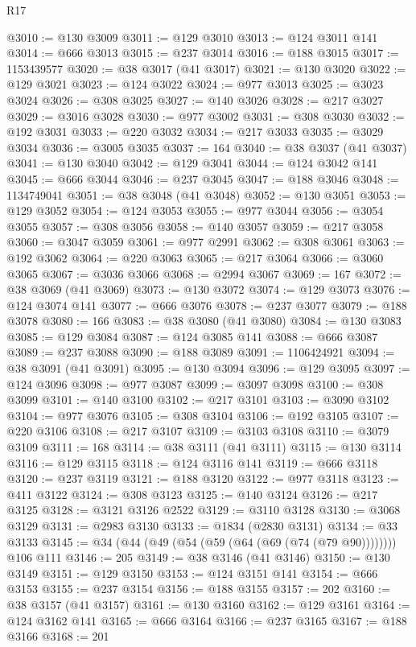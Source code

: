 \begin{lexlean}{R17}
\begin{coremodule}
@3010 := @130 @3009
@3011 := @129 @3010
@3013 := @124 @3011 @141
@3014 := @666 @3013
@3015 := @237 @3014
@3016 := @188 @3015
@3017 := 1153439577
@3020 := @38 @3017 (@41 @3017)
@3021 := @130 @3020
@3022 := @129 @3021
@3023 := @124 @3022
@3024 := @977 @3013
@3025 := @3023 @3024
@3026 := @308 @3025
@3027 := @140 @3026
@3028 := @217 @3027
@3029 := @3016 @3028
@3030 := @977 @3002
@3031 := @308 @3030
@3032 := @192 @3031
@3033 := @220 @3032
@3034 := @217 @3033
@3035 := @3029 @3034
@3036 := @3005 @3035
@3037 := 164
@3040 := @38 @3037 (@41 @3037)
@3041 := @130 @3040
@3042 := @129 @3041
@3044 := @124 @3042 @141
@3045 := @666 @3044
@3046 := @237 @3045
@3047 := @188 @3046
@3048 := 1134749041
@3051 := @38 @3048 (@41 @3048)
@3052 := @130 @3051
@3053 := @129 @3052
@3054 := @124 @3053
@3055 := @977 @3044
@3056 := @3054 @3055
@3057 := @308 @3056
@3058 := @140 @3057
@3059 := @217 @3058
@3060 := @3047 @3059
@3061 := @977 @2991
@3062 := @308 @3061
@3063 := @192 @3062
@3064 := @220 @3063
@3065 := @217 @3064
@3066 := @3060 @3065
@3067 := @3036 @3066
@3068 := @2994 @3067
@3069 := 167
@3072 := @38 @3069 (@41 @3069)
@3073 := @130 @3072
@3074 := @129 @3073
@3076 := @124 @3074 @141
@3077 := @666 @3076
@3078 := @237 @3077
@3079 := @188 @3078
@3080 := 166
@3083 := @38 @3080 (@41 @3080)
@3084 := @130 @3083
@3085 := @129 @3084
@3087 := @124 @3085 @141
@3088 := @666 @3087
@3089 := @237 @3088
@3090 := @188 @3089
@3091 := 1106424921
@3094 := @38 @3091 (@41 @3091)
@3095 := @130 @3094
@3096 := @129 @3095
@3097 := @124 @3096
@3098 := @977 @3087
@3099 := @3097 @3098
@3100 := @308 @3099
@3101 := @140 @3100
@3102 := @217 @3101
@3103 := @3090 @3102
@3104 := @977 @3076
@3105 := @308 @3104
@3106 := @192 @3105
@3107 := @220 @3106
@3108 := @217 @3107
@3109 := @3103 @3108
@3110 := @3079 @3109
@3111 := 168
@3114 := @38 @3111 (@41 @3111)
@3115 := @130 @3114
@3116 := @129 @3115
@3118 := @124 @3116 @141
@3119 := @666 @3118
@3120 := @237 @3119
@3121 := @188 @3120
@3122 := @977 @3118
@3123 := @411 @3122
@3124 := @308 @3123
@3125 := @140 @3124
@3126 := @217 @3125
@3128 := @3121 @3126 @2522
@3129 := @3110 @3128
@3130 := @3068 @3129
@3131 := @2983 @3130
@3133 := @1834 (@2830 @3131)
@3134 := @33 @3133
@3145 := @34 (@44 (@49 (@54 (@59 (@64 (@69 (@74 (@79 @90)))))))) @106 @111
@3146 := 205
@3149 := @38 @3146 (@41 @3146)
@3150 := @130 @3149
@3151 := @129 @3150
@3153 := @124 @3151 @141
@3154 := @666 @3153
@3155 := @237 @3154
@3156 := @188 @3155
@3157 := 202
@3160 := @38 @3157 (@41 @3157)
@3161 := @130 @3160
@3162 := @129 @3161
@3164 := @124 @3162 @141
@3165 := @666 @3164
@3166 := @237 @3165
@3167 := @188 @3166
@3168 := 201

\end{coremodule}
\end{lexlean}
